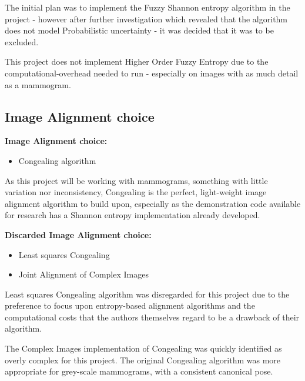 The initial plan was to implement the Fuzzy Shannon entropy algorithm in the project - however after further investigation which revealed that the algorithm does not model Probabilistic uncertainty - it was decided that it was to be excluded.

This project does not implement Higher Order Fuzzy Entropy due to the computational-overhead needed to run - especially on images with as much detail as a mammogram.


\subsection{Image Alignment choice}

\textbf{Image Alignment choice:}
\begin{itemize}
    \item \Gls{Congealing} algorithm
\end{itemize}

As this project will be working with mammograms, something with little variation nor inconsistency, \Gls{Congealing} is the perfect, light-weight image alignment algorithm to build upon, especially as the demonstration code available for research has a Shannon entropy implementation already developed.

\textbf{Discarded Image Alignment choice:}
\begin{itemize}
    \item Least squares \gls{Congealing}
    \item Joint Alignment of Complex Images
\end{itemize}

Least squares \gls{Congealing} algorithm was disregarded for this project due to the preference to focus upon entropy-based alignment algorithms and the computational costs that the authors themselves regard to be a drawback of their algorithm.

The Complex Images implementation of \Gls{Congealing} was quickly identified as overly complex for this project. The original \Gls{Congealing} algorithm was more appropriate for grey-scale mammograms, with a consistent canonical pose.
